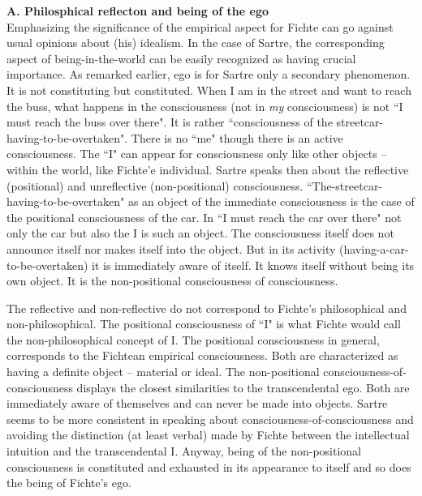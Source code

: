 {\bf A. Philosphical reflecton and being of the ego} \\
Emphasizing the significance of the empirical aspect for Fichte can go against usual opinions about (his) 
idealism. In the case of Sartre, the corresponding aspect of being-in-the-world can be easily recognized as having 
crucial importance. As remarked earlier, ego is for Sartre only a secondary phenomenon. It is not constituting 
but  constituted. When I am in the street and want to reach the buss, what happens in the consciousness (not in 
{\em my} consciousness) is not ``I must reach the buss over there". It is rather ``consciousness of the streetcar-having-to-be-overtaken". \cite{ToE} There is no ``me" though there is an active consciousness. The ``I" can appear for consciousness 
only like other objects -- within the world, like Fichte'e individual. Sartre speaks then about the reflective 
(positional) and unreflective (non-positional) consciousness. ``The-streetcar-having-to-be-overtaken" as an object of 
the immediate consciousness is the case of the positional consciousness of the car. In ``I must reach the car over 
there" not only the car but also the I is such an object. The consciousness itself does not announce itself nor makes 
itself into the object. But in its activity (having-a-car-to-be-overtaken) it is immediately aware of itself. It knows 
itself without being its own object. It is the non-positional consciousness of consciousness.

The reflective and non-reflective do not correspond to Fichte's philosophical and non-philosophical. The 
positional consciousness of ``I" is what Fichte would call the non-philosophical concept of I. The positional 
consciousness in general, corresponds to the Fichtean empirical consciousness. Both are characterized as having a 
definite object -- material or ideal. The non-positional consciousness-of-consciousness displays the closest 
similarities to the transcendental ego. Both are immediately aware of themselves and can never be made into 
objects. Sartre seems to be more consistent in speaking about consciousness-of-consciousness and avoiding the 
distinction (at least verbal) made by Fichte between the intellectual intuition and the transcendental I. Anyway, 
being of the non-positional consciousness is constituted and exhausted in its appearance to itself and so does the 
being of Fichte's ego.

